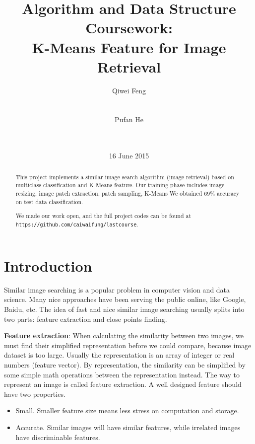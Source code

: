 \documentclass{acm_proc_article-sp}
\begin{document}
\title{Algorithm and Data Structure Coursework: \\K-Means Feature for
Image Retrieval}
\subtitle{}
%
%
\author{\alignauthor
Qiwei Feng\\
       \\
       \\
\alignauthor
Pufan He\\
       \\
       \\
}
\date{16 June 2015}

\maketitle
\begin{abstract}
        This project implements a similar image search algorithm (image
        retrieval) based on multiclass classification and K-Means feature. Our
        training phase includes image resizing, image patch extraction, patch
        sampling, K-Means
        We obtained 69\% accuracy on test data classification.

We made our work open, and the full project codes can be found at
\texttt{https://github.com/caiwaifung/lastcourse}.
\end{abstract}


\section{Introduction}
Similar image searching is a popular problem in computer vision and data
science. Many nice approaches have been serving the public online, like Google,
Baidu, etc. The idea of fast and nice similar image searching usually splits
into two parts: feature extraction and close points finding.

\textbf{Feature extraction}: When calculating the similarity between two
images, we must find their simplified representation before we could compare,
because image dataset is too large. Usually the representation is an array of
integer or real numbers (feature vector). By representation, the similarity can
be simplified by some simple math operations between the representation
instead. The way to represent an image is called feature extraction. A well
designed feature should have two properties.
\begin{itemize}
\item Small. Smaller feature size means less stress on computation and storage.
\item Accurate. Similar images will have similar features, while irrelated
        images have discriminable features.
\end{itemize}
\end{document}
